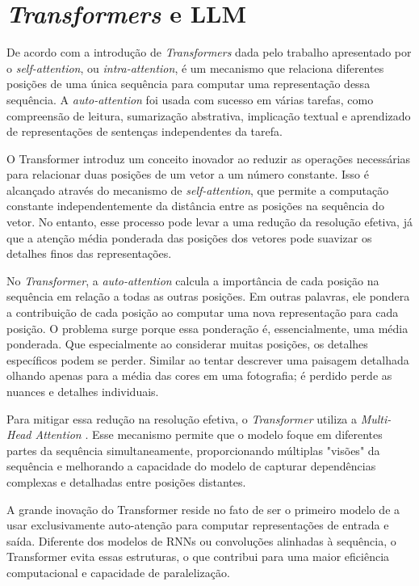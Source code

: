 \newpage
\section{\textit{Transformers} e LLM}

De acordo com a introdução de \textit{Transformers} dada pelo trabalho apresentado por \cite{vaswani2023attentionneed} o \textit{self-attention}, ou \textit{intra-attention}, é um mecanismo  que relaciona diferentes posições de uma única sequência para computar uma representação dessa sequência. A \textit{auto-attention} foi usada com sucesso em várias tarefas, como compreensão de leitura, sumarização abstrativa, implicação textual e aprendizado de representações de sentenças independentes da tarefa.

O Transformer introduz um conceito inovador ao reduzir as operações necessárias para relacionar duas posições de um vetor a um número constante. Isso é alcançado através do mecanismo de\textit{ self-attention}, que permite a computação constante independentemente da distância entre as posições na sequência do vetor. No entanto, esse processo pode levar a uma redução da resolução efetiva, já que a atenção média ponderada das posições dos vetores pode suavizar os detalhes finos das representações.

No \textit{Transformer}, a \textit{auto-attention} calcula a importância de cada posição na sequência em relação a todas as outras posições. Em outras palavras, ele pondera a contribuição de cada posição ao computar uma nova representação para cada posição. O problema surge porque essa ponderação é, essencialmente, uma média ponderada. Que especialmente ao considerar muitas posições, os detalhes específicos podem se perder. Similar ao tentar descrever uma paisagem detalhada olhando apenas para a média das cores em uma fotografia; é perdido perde as nuances e detalhes individuais.

Para mitigar essa redução na resolução efetiva, o \textit{Transformer} utiliza a \textit{Multi-Head Attention} \cite{vaswani2023attentionneed}. Esse mecanismo permite que o modelo foque em diferentes partes da sequência simultaneamente, proporcionando múltiplas "visões" da sequência e melhorando a capacidade do modelo de capturar dependências complexas e detalhadas entre posições distantes.

A grande inovação do Transformer reside no fato de ser o primeiro modelo de  a usar exclusivamente auto-atenção para computar representações de entrada e saída. Diferente dos modelos de RNNs ou convoluções alinhadas à sequência, o Transformer evita essas estruturas, o que contribui para uma maior eficiência computacional e capacidade de paralelização.

